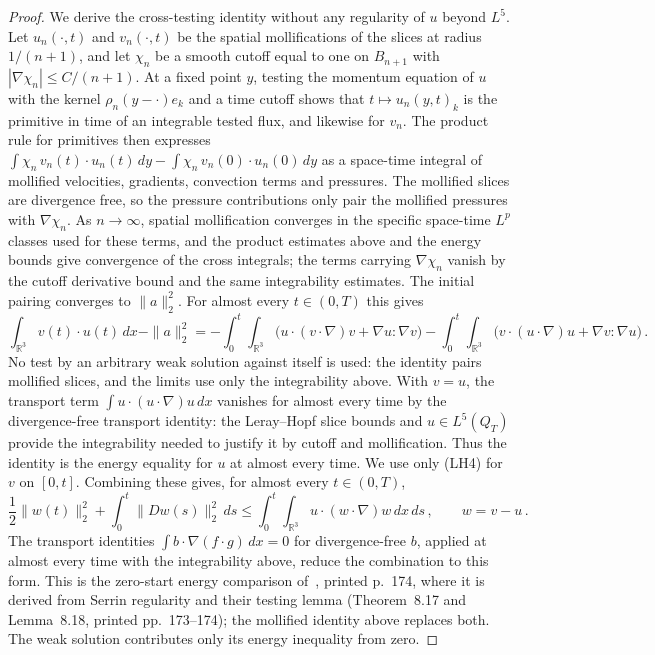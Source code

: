 \documentclass[11pt,letterpaper]{article}
\numberwithin{equation}{section}
\theoremstyle{plain}
\theoremstyle{definition}
\theoremstyle{remark}
\begin{document}
\begin{proof}
We derive the cross-testing identity without any regularity of $u$ beyond $L^5$. Let $u_n(\cdot,t)$ and $v_n(\cdot,t)$ be the spatial mollifications of the slices at radius $1/(n+1)$, and let $\chi_n$ be a smooth cutoff equal to one on $B_{n+1}$ with $|\nabla\chi_n|\le C/(n+1)$. At a fixed point $y$, testing the momentum equation of $u$ with the kernel $\rho_n(y-\cdot)e_k$ and a time cutoff shows that $t\mapsto u_n(y,t)_k$ is the primitive in time of an integrable tested flux, and likewise for $v_n$. The product rule for primitives then expresses $\int\chi_n\,v_n(t)\cdot u_n(t)\,dy-\int\chi_n\,v_n(0)\cdot u_n(0)\,dy$ as a space-time integral of mollified velocities, gradients, convection terms and pressures. The mollified slices are divergence free, so the pressure contributions only pair the mollified pressures with $\nabla\chi_n$. As $n\to\infty$, spatial mollification converges in the specific space-time $L^p$ classes used for these terms, and the product estimates above and the energy bounds give convergence of the cross integrals; the terms carrying $\nabla\chi_n$ vanish by the cutoff derivative bound and the same integrability estimates. The initial pairing converges to $\|a\|_2^2$. For almost every $t\in(0,T)$ this gives
\begin{equation*}
\int_{\mathbb R^3}v(t)\cdot u(t)\,dx-\|a\|_2^2
 =-\int_0^t\!\!\int_{\mathbb R^3}\bigl(u\cdot(v\cdot\nabla)v+\nabla u:\nabla v\bigr)
 -\int_0^t\!\!\int_{\mathbb R^3}\bigl(v\cdot(u\cdot\nabla)u+\nabla v:\nabla u\bigr)\,.
\end{equation*}
No test by an arbitrary weak solution against itself is used: the identity pairs mollified slices, and the limits use only the integrability above. With $v=u$, the transport term $\int u\cdot(u\cdot\nabla)u\,dx$ vanishes for almost every time by the divergence-free transport identity: the Leray--Hopf slice bounds and $u\in L^5(Q_T)$ provide the integrability needed to justify it by cutoff and mollification. Thus the identity is the energy equality for $u$ at almost every time. We use only (LH4) for $v$ on $[0,t]$. Combining these gives, for almost every $t\in(0,T)$,
\begin{equation*}
\frac12\|w(t)\|_2^2+\int_0^t\|Dw(s)\|_2^2\,ds
 \le\int_0^t\int_{\mathbb R^3}u\cdot(w\cdot\nabla)w\,dx\,ds\,,\qquad w=v-u\,.
\end{equation*}
The transport identities $\int b\cdot\nabla(f\cdot g)\,dx=0$ for divergence-free $b$, applied at almost every time with the integrability above, reduce the combination to this form. This is the zero-start energy comparison of~\cite[(8.12)]{RobinsonRodrigoSadowski2016}, printed p.~174, where it is derived from Serrin regularity and their testing lemma (Theorem~8.17 and Lemma~8.18, printed pp.~173--174); the mollified identity above replaces both. The weak solution contributes only its energy inequality from zero.


\end{proof}
\end{document}
